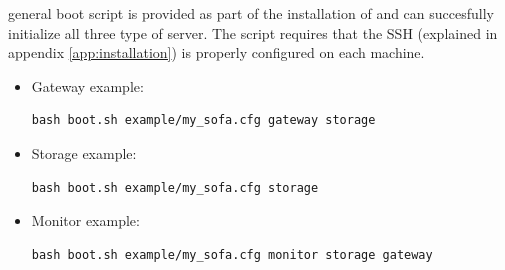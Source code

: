  general boot script is provided as part of the installation of \CodeName and can succesfully initialize all three type of server. The script requires that the SSH (explained in appendix \ref{app:installation}) is properly configured on each machine.
\begin{itemize}
	\begin{lstlisting}[numbers=none, backgroundcolor=\color{sourcebackground}, rulecolor=\color{sourcebackground}, framextopmargin=5pt, framexbottommargin=5pt, frame=tb, xrightmargin=15pt, commentstyle=\color{bashcommetcolor}, showstringspaces=false, deletendkeywords={file, list}]
	cd $SOFA_HOME/
	
	# General pattern for the boot script
	bash boot.sh <path to cfg file> <state>
	\end{lstlisting}
	\vspace*{-6mm}

	\item Gateway example:
	\begin{lstlisting}[numbers=none, backgroundcolor=\color{sourcebackground}, rulecolor=\color{sourcebackground}, framextopmargin=5pt, framexbottommargin=5pt, frame=tb, xrightmargin=15pt, commentstyle=\color{bashcommetcolor}, showstringspaces=false]
	bash boot.sh example/my_sofa.cfg gateway storage
	\end{lstlisting}
	\vspace*{-6mm}
	
	\item Storage example:
	\begin{lstlisting}[numbers=none, backgroundcolor=\color{sourcebackground}, rulecolor=\color{sourcebackground}, framextopmargin=5pt, framexbottommargin=5pt, frame=tb, xrightmargin=15pt, commentstyle=\color{bashcommetcolor}, showstringspaces=false]
	bash boot.sh example/my_sofa.cfg storage
	\end{lstlisting}
	\vspace*{-6mm}
	
	\item Monitor example:
	\begin{lstlisting}[numbers=none, backgroundcolor=\color{sourcebackground}, rulecolor=\color{sourcebackground}, framextopmargin=5pt, framexbottommargin=5pt, frame=tb, xrightmargin=15pt, commentstyle=\color{bashcommetcolor}, showstringspaces=false]
	bash boot.sh example/my_sofa.cfg monitor storage gateway
	\end{lstlisting}	
\end{itemize}

